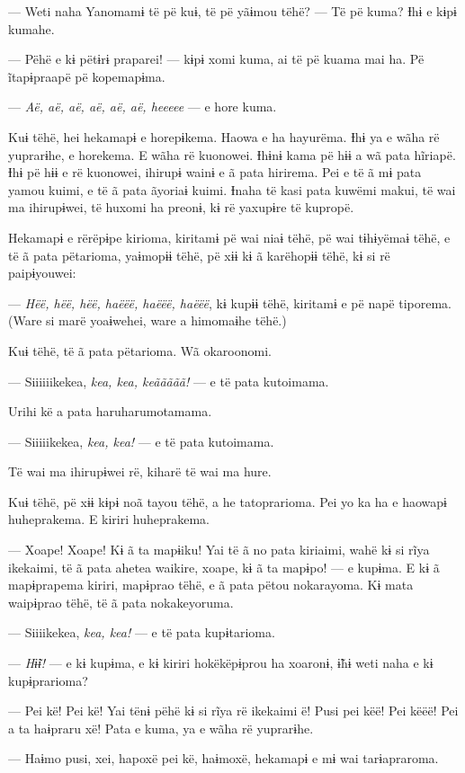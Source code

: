 --- Weti naha Yanomamɨ të pë kuɨ, të pë yãɨmou tëhë? --- Të pë kuma? Ɨhɨ
e kɨpɨ kumahe. 

--- Pëhë e kɨ pëtɨrɨ praparei! --- kɨpɨ xomi kuma, ai të pë kuama mai
ha. Pë ĩtapɨpraapë pë kopemapɨma. 

--- \textit{Aë, aë, aë, aë, aë, aë, heeeee} --- e hore kuma. 

Kuɨ tëhë, hei hekamapɨ e horepɨkema. Haowa e ha hayurëma. Ɨhɨ ya e wãha
rë yuprarɨhe, e horekema. E wãha rë kuonowei. Ɨhɨnɨ kama pë hɨɨ a wã
pata hĩriapë. Ɨhɨ pë hɨɨ e rë kuonowei, ihirupɨ wainɨ e ã pata hirirema.
Pei e të ã mɨ pata yamou kuimi, e të ã pata ãyoriaɨ kuimi. Ɨnaha të kasi
pata kuwëmi makui, të wai ma ihirupɨwei, të huxomi ha preonɨ, kɨ rë
yaxupɨre të kupropë. 

Hekamapɨ e rërëpɨpe kirioma, kiritamɨ pë wai niaɨ tëhë, pë wai tɨhɨyëmaɨ
tëhë, e të ã pata pëtarioma, yaɨmopɨɨ tëhë, pë xɨɨ kɨ ã karëhopɨɨ tëhë,
kɨ si rë paipɨyouwei: 

--- \textit{Hëë, hëë, hëë, haëëë, haëëë, haëëë}, kɨ kupɨɨ tëhë, kiritamɨ e pë
napë tiporema. (Ware si marë yoaɨwehei, ware a himomaɨhe tëhë.) 

Kuɨ tëhë, të ã pata pëtarioma. Wã okaroonomi. 

--- Siiiiiikekea, \textit{kea, kea, keããããã!} --- e të pata kutoimama. 

Urihi kë a pata haruharumotamama. 

--- Siiiiikekea, \textit{kea, kea!} --- e të pata kutoimama. 

Të wai ma ihirupɨwei rë, kiharë të wai ma hure. 

Kuɨ tëhë, pë xɨɨ kɨpɨ noã tayou tëhë, a he tatoprarioma. Pei yo ka ha e
haowapɨ huheprakema. E kiriri huheprakema. 

--- Xoape! Xoape! Kɨ ã ta mapɨiku! Yai të ã no pata kiriaimi, wahë kɨ si
rĩya ikekaimi, të ã pata ahetea waikire, xoape, kɨ ã ta mapɨpo! --- e
kupɨma. E kɨ ã mapɨprapema kiriri, mapɨprao tëhë, e ã pata pëtou
nokarayoma. Kɨ mata waipɨprao tëhë, të ã pata nokakeyoruma. 

--- Siiiikekea, \textit{kea, kea!} --- e të pata kupɨtarioma. 

--- \textit{Hɨ̃ɨ!} --- e kɨ kupɨma, e kɨ kiriri hokëkëpɨprou ha xoaronɨ, ɨ̃hɨ weti
naha e kɨ kupɨprarioma?

--- Pei kë! Pei kë! Yai tënɨ pëhë kɨ si rĩya rë ikekaimi ë! Pusi pei
këë! Pei këëë! Pei a ta haɨpraru xë! Pata e kuma, ya e wãha rë
yuprarɨhe.

--- Haɨmo pusi, xei, hapoxë pei kë, haɨmoxë, hekamapɨ e mɨ wai
tarɨapraroma. 

